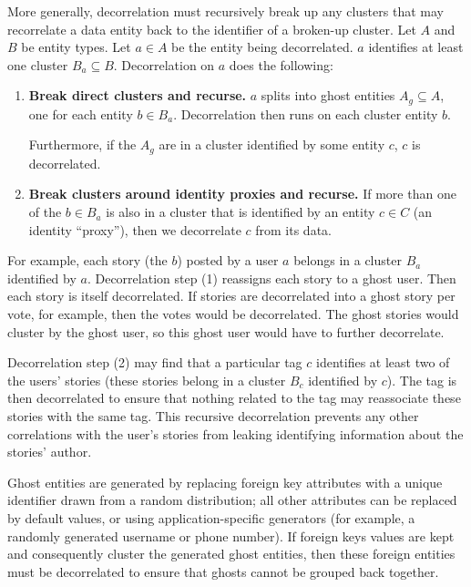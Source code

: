More generally, decorrelation must recursively break up any clusters that may recorrelate a data
entity back to the identifier of a broken-up cluster. Let $A$ and $B$ be entity types. Let $a \in A$
be the entity being decorrelated. $a$ identifies at least one cluster $B_a \subseteq B$.
Decorrelation on $a$ does the following: 
\begin{enumerate} 
    
    \item \textbf{Break direct clusters and
            recurse.} $a$ splits into ghost entities $A_g \subseteq A$, one for each entity $b\in B_a$.
            Decorrelation then runs on each cluster entity $b$.
            
            Furthermore, if the $A_g$ are in a cluster identified by some entity $c$, $c$ is
            decorrelated.

    \item \textbf{Break clusters around identity proxies and recurse.} If more than one of the
        $b \in B_a$ is also in a cluster that is identified by an entity $c \in C$ (an identity
        ``proxy''), then we decorrelate $c$ from its data. 
        
\end{enumerate}
For example, each story (the $b$) posted by a user $a$ belongs in a cluster $B_a$ identified by $a$.
Decorrelation step (1) reassigns each story to a ghost user. Then each story is itself decorrelated.
If stories are decorrelated into a ghost story per vote, for example, then the votes would be
decorrelated. The ghost stories would cluster by the ghost user, so this ghost user would have to
further decorrelate.

Decorrelation step (2) may find that a particular tag $c$ identifies at least two of the users'
stories (these stories belong in a cluster $B_c$ identified by $c$). The tag is then decorrelated to
ensure that nothing related to the tag may reassociate these stories with the same tag.  This
recursive decorrelation prevents any other correlations with the user's stories from leaking
identifying information about the stories' author.

Ghost entities are generated by replacing foreign key attributes with a unique identifier drawn
from a random distribution; all other attributes can be replaced by default values, or
using application-specific generators (for example, a randomly generated username or phone number).
If foreign keys values are kept and consequently cluster the generated ghost entities, then these
foreign entities must be decorrelated to ensure that ghosts cannot be grouped back together.

